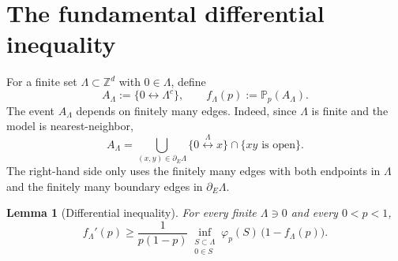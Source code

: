 \documentclass[11pt]{article}
\newtheorem{lemma}{Lemma}
\newcommand{\Z}{\mathbb Z}
\newcommand{\Pp}{\mathbb P_p}
\newcommand{\conn}{\longleftrightarrow}
\newcommand{\phip}{\varphi_p}
\begin{document}
\section{The fundamental differential inequality}

For a finite set $\Lambda\subset\Z^d$ with $0\in\Lambda$, define
\[
 A_\Lambda:=\{0\conn \Lambda^c\},
 \qquad
 f_\Lambda(p):=\Pp(A_\Lambda).
\]
The event $A_\Lambda$ depends on finitely many edges. Indeed, since $\Lambda$ is finite and the model is nearest-neighbor,
\[
 A_\Lambda
 =
 \bigcup_{(x,y)\in\partial_E\Lambda}
 \bigl\{0\stackrel{\Lambda}{\conn}x\bigr\}\cap\{xy\text{ is open}\}.
\]
The right-hand side only uses the finitely many edges with both endpoints in $\Lambda$ and the finitely many boundary edges in $\partial_E\Lambda$.

\begin{lemma}[Differential inequality]
For every finite $\Lambda\ni0$ and every $0<p<1$,
\[
 f_\Lambda'(p)
 \ge
 \frac1{p(1-p)}
 \inf_{\substack{S\subset\Lambda\\0\in S}}
 \phip(S)\,
 \bigl(1-f_\Lambda(p)\bigr).
\]
\end{lemma}
\end{document}
